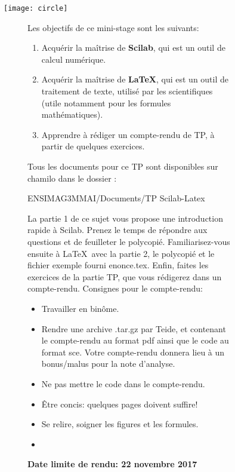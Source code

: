 \documentclass[a4paper,11pt]{article}
\begin{document}
\begin{figure}
\texttt{[image: circle]}
\begin{figure}
\maketitle

\noindent Les objectifs de ce mini-stage sont les suivants:
\begin{enumerate}
\item Acquérir la maîtrise de {\bf Scilab}, qui est un outil de calcul
  numérique.
\item Acquérir la maîtrise de {\bf \LaTeX}, qui est un outil de
  traitement de texte, utilisé par les scientifiques (utile notamment
  pour les formules mathématiques).
\item Apprendre à rédiger un compte-rendu de TP, à partir de quelques
  exercices.
\end{enumerate}
Tous les documents pour ce TP sont disponibles sur chamilo
 dans le dossier :\\
\begin{center}
ENSIMAG3MMAI/Documents/TP Scilab-Latex
\end{center}

La partie 1 de ce sujet vous propose une introduction rapide à
Scilab. Prenez le temps de répondre aux questions et de feuilleter le
polycopié. Familiarisez-vous ensuite à \LaTeX\ avec la
partie 2, le polycopié et le fichier exemple fourni enonce.tex. Enfin, faites les
exercices de la partie TP, que vous rédigerez dans un compte-rendu.
Consignes pour le compte-rendu:
\begin{itemize}
\item Travailler en binôme.
\item Rendre une archive .tar.gz par Teide, et contenant le
  compte-rendu au format pdf ainsi que le code au format sce. Votre
  compte-rendu donnera lieu à un bonus/malus pour la note d'analyse.
\item Ne pas mettre le code dans le compte-rendu.
\item Être concis: quelques pages doivent suffire!
\item Se relire, soigner les figures et les formules.
\item[]
\end{itemize}
\begin{center}
\textbf{Date limite de rendu: 22 novembre 2017}\\
\end{center}


\end{figure}
\end{figure}
\end{document}
